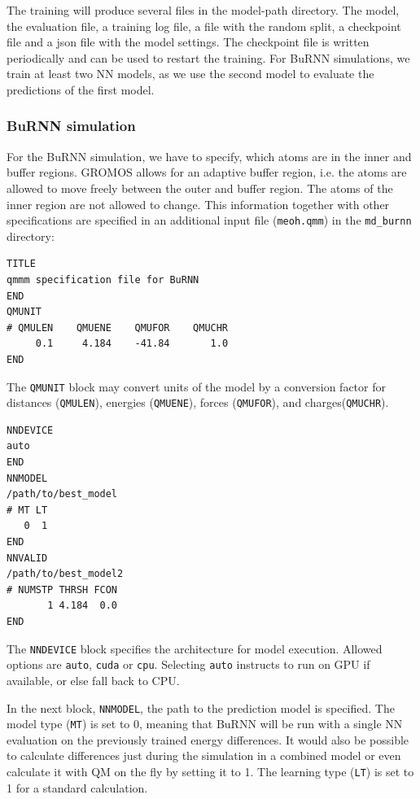 The training will produce several files in the model-path directory. The model, the evaluation file, a training log file, a file with the random split, a checkpoint file and a json file with the model settings. The checkpoint file is written periodically and can be used to restart the training. For BuRNN simulations, we train at least two NN models, as we use the second model to evaluate the predictions of the first model.



\subsubsection{BuRNN simulation}

For the BuRNN simulation, we have to specify, which atoms are in the inner and buffer regions. GROMOS allows for an adaptive buffer region, i.e. the atoms are allowed to move freely between the outer and buffer region. The atoms of the inner region are not allowed to change. This information together with other specifications are specified in an additional input file (\texttt{meoh.qmm}) in the \texttt{md\_burnn} directory:

\begin{lstlisting}[breaklines=true, breakatwhitespace=false]
TITLE
qmmm specification file for BuRNN  
END
QMUNIT
# QMULEN    QMUENE    QMUFOR    QMUCHR
     0.1     4.184    -41.84       1.0
END
\end{lstlisting}

The \texttt{QMUNIT} block may convert units of the model by a conversion factor for distances (\texttt{QMULEN}), energies (\texttt{QMUENE}), forces (\texttt{QMUFOR}), and charges(\texttt{QMUCHR}).

\begin{lstlisting}[breaklines=true, breakatwhitespace=false]
NNDEVICE
auto
END
NNMODEL
/path/to/best_model
# MT LT
   0  1
END
NNVALID
/path/to/best_model2
# NUMSTP THRSH FCON 
       1 4.184  0.0
END
\end{lstlisting}


The \texttt{NNDEVICE} block specifies the architecture for model execution. Allowed options are \texttt{auto}, \texttt{cuda} or \texttt{cpu}. Selecting \texttt{auto} instructs to run on GPU if available, or else fall back to CPU.

In the next block, \texttt{NNMODEL}, the path to the prediction model is specified. The model type (\texttt{MT}) is set to 0, meaning that BuRNN will be run with a single NN evaluation on the previously trained energy differences. It would also be possible to calculate differences just during the simulation in a combined model or even calculate it with QM on the fly by setting it to 1. The learning type (\texttt{LT}) is set to 1 for a standard calculation. 

